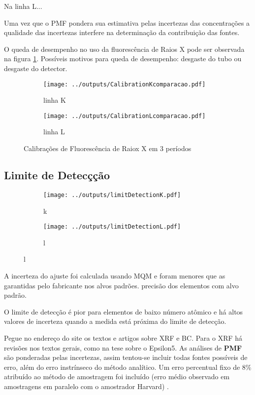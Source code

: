 Na linha L...

Uma vez que o PMF pondera sua estimativa pelas incertezas das concentrações a
qualidade das incertezas interfere na determinação da contribuição das fontes.

\begin{landscape}
  
\end{landscape}

\begin{landscape}
  
\end{landscape}


O queda de desempenho no uso da fluorescência de Raios X pode ser observada 
na figura \ref{fig:compara_calibracao}. 
Possíveis motivos para queda de desempenho: desgaste do tubo ou desgaste do detector. 

\begin{figure}[H]
  \begin{subfigure}[b]{0.5\textwidth}
    \texttt{[image: ../outputs/CalibrationKcomparacao.pdf]}
    \caption{linha K}
  \end{subfigure}%
  \begin{subfigure}[b]{0.5\textwidth}
    \texttt{[image: ../outputs/CalibrationLcomparacao.pdf]}
    \caption{linha L}
  \end{subfigure}
  \caption{Calibrações de Fluorescência de Raiox X em 3 períodos \label{fig:compara_calibracao}}
\end{figure}

\subsection{Limite de Detecçção}

\begin{figure}[H]
  \caption{}
  \begin{subfigure}[b]{0.5\textwidth}
    \texttt{[image: ../outputs/limitDetectionK.pdf]}
    \caption{k}
  \end{subfigure}%
  \begin{subfigure}[b]{0.5\textwidth}
    \texttt{[image: ../outputs/limitDetectionL.pdf]}
    \caption{l}
  \end{subfigure}
\end{figure}

A incerteza do ajuste foi calculada usando MQM e foram menores que as garantidas
pelo fabricante nos alvos padrões.  precisão dos elementos com alvo padrão. 

O limite de detecção é pior para elementos de baixo número atômico e há
altos valores de incerteza quando a medida está próxima do limite de detecção.

Pegue no endereço do site os textos e artigos sobre XRF e BC.
Para o XRF há revisões nos textos gerais, como na tese sobre o Epsilon5.
As análises de \textbf{PMF} são ponderadas pelas incertezas, assim 
tentou-se incluir todas fontes possíveis de erro, além do erro instrínseco 
do método analítico. Um erro percentual fixo de 8\% atribuído ao método 
de amostragem foi incluído 
(erro médio observado em amostragens em paralelo com o amostrador Harvard)
\citep{santos2014}.
